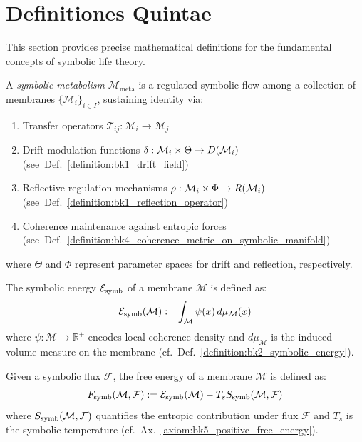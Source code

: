 \section{Definitiones Quintae}
\label{sec:bk5_definitiones_quintae}
This section provides precise mathematical definitions for the fundamental concepts of symbolic life theory.

\begin{definition}
\label{definition:bk5_symbolic_metabolism}
A \emph{symbolic metabolism} $\mathcal{M}_{\mathrm{meta}}$ is a regulated symbolic flow among a collection of membranes $\{\mathcal{M}_i\}_{i \in I}$, sustaining identity via:
\begin{enumerate}
  \item Transfer operators $\mathcal{T}_{ij}: \mathcal{M}_i \to \mathcal{M}_j$
  \item Drift modulation functions $\delta: \mathcal{M}_i \times \Theta \to D(\mathcal{M}_i)$ (see~Def.~\ref{definition:bk1_drift_field})
  \item Reflective regulation mechanisms $\rho: \mathcal{M}_i \times \Phi \to R(\mathcal{M}_i)$ (see~Def.~\ref{definition:bk1_reflection_operator})
  \item Coherence maintenance against entropic forces (see~Def.~\ref{definition:bk4_coherence_metric_on_symbolic_manifold})
\end{enumerate}
\noindent where $\Theta$ and $\Phi$ represent parameter spaces for drift and reflection, respectively.
\end{definition}

\begin{definition}
\label{definition:bk5_symbolic_energy}
The symbolic energy $\mathcal{E}_{\mathrm{symb}}$ of a membrane $\mathcal{M}$ is defined as:
\begin{equation}
\mathcal{E}_{\mathrm{symb}}(\mathcal{M}) := \int_{\mathcal{M}} \psi(x) \, d\mu_{\mathcal{M}}(x)
\end{equation}
\noindent where $\psi: \mathcal{M} \to \mathbb{R}^+$ encodes local coherence density and $d\mu_{\mathcal{M}}$ is the induced volume measure on the membrane (cf.~Def.~\ref{definition:bk2_symbolic_energy}).
\end{definition}

\begin{definition}
\label{definition:bk5_symbolic_free_energy_und}
Given a symbolic flux $\mathcal{F}$, the free energy of a membrane $\mathcal{M}$ is defined as:
\begin{equation}
F_{\mathrm{symb}}(\mathcal{M}, \mathcal{F}) := \mathcal{E}_{\mathrm{symb}}(\mathcal{M}) - T_s S_{\mathrm{symb}}(\mathcal{M}, \mathcal{F})
\end{equation}
\noindent where $S_{\mathrm{symb}}(\mathcal{M}, \mathcal{F})$ quantifies the entropic contribution under flux $\mathcal{F}$ and $T_s$ is the symbolic temperature (cf.~Ax.~\ref{axiom:bk5_positive_free_energy}).
\end{definition}

